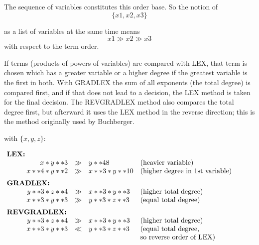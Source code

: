 The sequence of variables constitutes this order base. So the notion
of
\[
\{x1,x2,x3\}
\]

as a list of variables at the same time means
\[
x1 \gg x2 \gg x3
\]
with respect to the term order.

If terms (products of powers of variables) are compared with LEX,
that term is chosen which has a greater variable or a higher degree
if the greatest variable is the first in both. With GRADLEX the sum of
all exponents (the total degree) is compared first, and if that does
not lead to a decision, the LEX method is taken for the final decision.
The REVGRADLEX method also compares the total degree first, but
afterward it uses the LEX method in the reverse direction; this is the
method originally used by Buchberger.

\example with $\{x,y,z\}$: 

\[
\begin{array}{rlll}
\multicolumn{2}{l}{\hspace*{-1cm}\mbox{\bf LEX:}}\\
 x * y **3 & \gg & y ** 48 & \mbox{(heavier variable)} \\
 x**4 * y**2 & \gg  & x**3 * y**10 & \mbox{(higher degree in 1st
variable)} \vspace*{2mm} \\
\multicolumn{2}{l}{\hspace*{-1cm}\mbox{\bf GRADLEX:}} \\
  y**3 * z**4 & \gg & x**3 * y**3 & \mbox{(higher total degree)} \\
  x**3 * y**3  & \gg & y**3 * z**3  & \mbox{(equal total degree)}
\vspace*{2mm}\\
\multicolumn{2}{l}{\hspace*{-1cm}\mbox{\bf
REVGRADLEX:}} \\
 y**3 * z**4 & \gg &  x**3 * y**3 & \mbox{(higher total degree)} \\
 x**3 * y**3 & \ll  &  y**3 * z**3  & \mbox{(equal total degree,} \\
 & & & \mbox{so reverse order of LEX)}
\end{array}
\]

